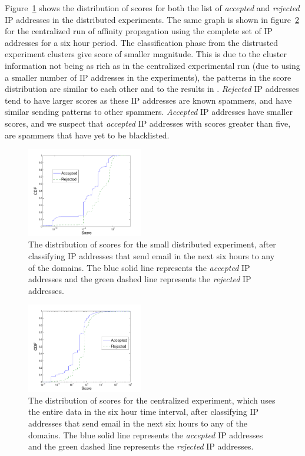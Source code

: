 Figure~\ref{fig:distScores} shows the distribution of scores for both the list of \emph{accepted} and \emph{rejected} IP addresses in the distributed experiments. The same graph is shown in figure~\ref{fig:centScores} for the centralized run of affinity propagation using the complete set of IP addresses for a six hour period. The classification phase from the distrusted experiment clusters give score of smaller magnitude. This is due to the cluster information not being as rich as in the centralized experimental run (due to using a smaller number of IP addresses in the experiments), the patterns in the score distribution are similar to each other and to the results in \cite{bb}. \emph{Rejected} IP addresses tend to have larger scores as these IP addresses are known spammers, and have similar sending patterns to other spammers. \emph{Accepted} IP addresses have smaller scores, and we suspect that \emph{accepted} IP addresses with scores greater than five, are spammers that have yet to be blacklisted. 
\begin{figure}[t]%
\centering
\includegraphics[width=0.45\textwidth]{figures/distScores2}
\caption{The distribution of scores for the small distributed experiment, after classifying IP addresses that send email in the next six hours to any of the domains. The blue solid line represents the \emph{accepted} IP addresses and the green dashed line represents the \emph{rejected} IP addresses. }
\label{fig:distScores}
\end{figure}

\begin{figure}[t]%
\centering
\includegraphics[width=0.45\textwidth]{figures/centralScores2}
\caption{The distribution of scores for the centralized experiment, which uses the entire data in the six hour time interval, after classifying IP addresses that send email in the next six hours to any of the domains. The blue solid line represents the \emph{accepted} IP addresses and the green dashed line represents the \emph{rejected} IP addresses.}
\label{fig:centScores}
\end{figure}

